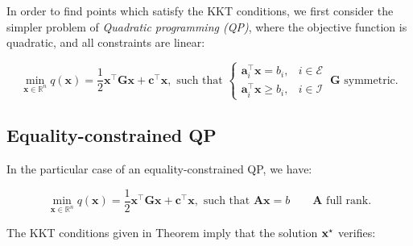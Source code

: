 In order to find points which satisfy the KKT conditions, we first
consider the simpler problem of \emph{Quadratic programming (QP)},
where the objective function is quadratic, and all constraints are
linear:

\begin{equation}
\label{eq:chap3-qp}
\min_{\mathbf{x} \in \mathbb R^n}
q(\mathbf{x})=\frac{1}{2}\mathbf{x}^{\top}\mathbf{G}\mathbf{x}
+\mathbf{c}^{\top}\mathbf{x},\text{ such that }
\left\{\begin{array}{cc}
\mathbf{a}_i^{\top}\mathbf{x} = b_i, & i \in \mathcal{E} \\%
\mathbf{a}_i^{\top}\mathbf{x} \ge b_i, & i \in \mathcal{I} %
\end{array}\right. ~\mathbf{G}\text{ symmetric.}
\end{equation}

\subsection{Equality-constrained QP}

In the particular case of an equality-constrained QP, we have:

\begin{equation}
\label{eq:chap3-qp-eq}
\min_{\mathbf{x} \in \mathbb R^n}
q(\mathbf{x})=\frac{1}{2}\mathbf{x}^{\top}\mathbf{G}\mathbf{x}
+\mathbf{c}^{\top}\mathbf{x},\text{ such that }
\mathbf{A}\mathbf{x} = b
\qquad \mathbf{A} \text{ full rank.}
\end{equation}

The KKT conditions given in Theorem  imply that the
solution $\mathbf{x}^{\star}$ verifies:

